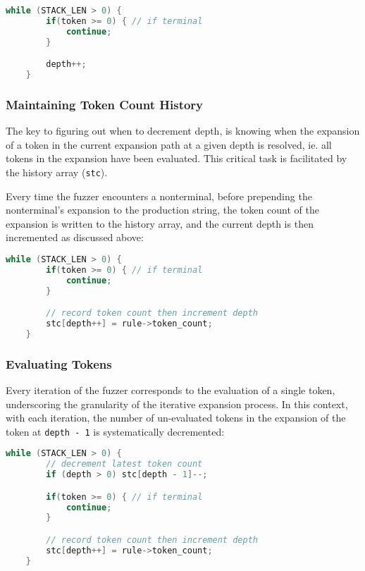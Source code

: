 \documentclass[8pt, twoside]{extarticle}
\begin{document}
\begin{lstlisting}[gobble=2, language=C, caption={Rudimentary depth increment}]
	while (STACK_LEN > 0) {
		if(token >= 0) { // if terminal
			continue;
		}

		depth++;
	}
\end{lstlisting}

\subsubsection{Maintaining Token Count History}

The key to figuring out when to decrement depth, is knowing when the expansion of a token in the current expansion path at a given depth is resolved, ie. all tokens in the expansion have been evaluated. This critical task is facilitated by the history array (\verb|stc|).

Every time the fuzzer encounters a nonterminal, before prepending the nonterminal's expansion to the production string, the token count of the expansion is written to the history array, and the current depth is then incremented as discussed above:

\begin{lstlisting}[gobble=2, language=C, caption={Writing token count to memory}]
	while (STACK_LEN > 0) {
		if(token >= 0) { // if terminal
			continue;
		}

		// record token count then increment depth
		stc[depth++] = rule->token_count;
	}
\end{lstlisting}

\subsubsection{Evaluating Tokens}

Every iteration of the fuzzer corresponds to the evaluation of a single token, underscoring the granularity of the iterative expansion process. In this context, with each iteration, the number of un-evaluated tokens in the expansion of the token at \verb|depth - 1| is systematically decremented:

\begin{lstlisting}[gobble=2, language=C, caption={Every loop is an evaluation}]
	while (STACK_LEN > 0) {
		// decrement latest token count
		if (depth > 0) stc[depth - 1]--;

		if(token >= 0) { // if terminal
			continue;
		}

		// record token count then increment depth
		stc[depth++] = rule->token_count;
	}
\end{lstlisting}
\end{document}
